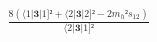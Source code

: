 \documentclass[varwidth, border=5pt]{standalone}
\begin{document}
\begin{my}
$\begin{gathered}
\scriptscriptstyle\frac{8(⟨1|𝟑|1]²+⟨2|𝟑|2]²-2m_h²s_{12})}{⟨2|𝟑|1]²}
\end{gathered}$
\end{my}
\end{document}
